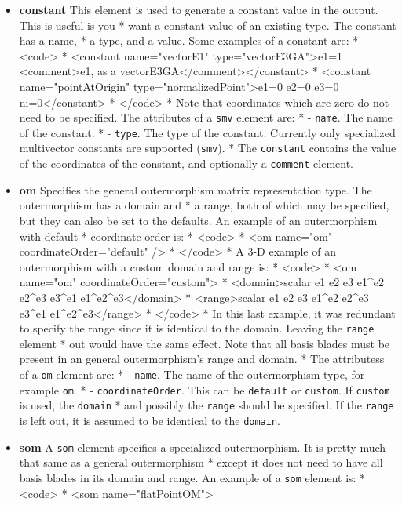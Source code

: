 \documentclass[10pt, a4paper]{article}
\begin{document}
\begin{itemize}
\item {\bf constant} This element is used to generate a constant value in the output. This is useful is you
 *     want a constant value of an existing type. The constant has a name, 
 *     a type, and a value. Some examples of a constant are:
 *     <code>
 *     <constant name="vectorE1" type="vectorE3GA">e1=1 <comment>e1, as a vectorE3GA</comment></constant>
 *     <constant name="pointAtOrigin" type="normalizedPoint">e1=0 e2=0 e3=0 ni=0</constant>
 *     </code>
 *     Note that coordinates which are zero do not need to be specified. The attributes of a {\tt smv} element are:
 *        - {\tt name}. The name of the constant.
 *        - {\tt type}. The type of the constant. Currently only specialized multivector constants are supported ({\tt smv}).
 *     The {\tt constant} contains the value of the coordinates of the constant, and optionally a {\tt comment} element.
\item {\bf om} Specifies the general outermorphism matrix representation type. The outermorphism has a domain and
 *     a range, both of which may be specified, but they can also be set to the defaults. An example of an outermorphism with default
 *     coordinate order is:
 *     <code>
 *     <om name="om" coordinateOrder="default" />
 *     </code>
 *     A 3-D example of an outermorphism with a custom domain and range is:
 *     <code>
 *     <om name="om" coordinateOrder="custom">
 *     <domain>scalar e1 e2 e3 e1^e2 e2^e3 e3^e1 e1^e2^e3</domain>
 *     <range>scalar e1 e2 e3 e1^e2 e2^e3 e3^e1 e1^e2^e3</range>
 *     </code>
 *     In this last example, it was redundant to specify the range since it is identical to the domain. Leaving the {\tt range} element
 *     out would have the same effect. Note that all basis blades must be present in an general outermorphism's range and domain.
 *     The attributess of a {\tt om} element are:
 *        - {\tt name}. The name of the outermorphism type, for example {\tt om}.
 *        - {\tt coordinateOrder}. This can be {\tt default} or {\tt custom}. If {\tt custom} is used, the {\tt domain}
 *           and possibly the {\tt range} should be specified. If the {\tt range} is left out, it is assumed to be identical to the {\tt domain}.
\item {\bf som} A {\tt som} element specifies a specialized outermorphism. It is pretty much that same as a general outermorphism
 *     except it does not need to have all basis blades in its domain and range. An example of a {\tt som} element is:
 *     <code>
 *     <som name="flatPointOM">

\end{itemize}
\end{document}
